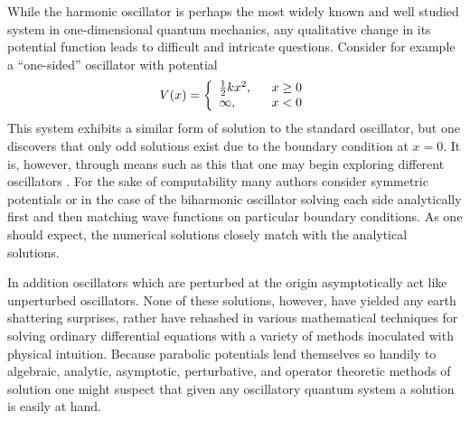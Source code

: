 \documentclass[12pt]{article}
\begin{document}
\par While the harmonic oscillator is perhaps the most widely known and well studied system in one-dimensional quantum mechanics, any qualitative change in its potential function leads to
difficult and intricate questions. Consider for example a ``one-sided'' oscillator with potential
\begin{equation}
V(x) = \left\{\begin{array}{ll}\frac{1}{2}kx^2, & \hspace{0.25cm} x\geq 0\\
\infty, & \hspace{0.25cm} x<0 \end{array}\right.
\end{equation}
This system exhibits a similar form of solution to the standard oscillator, but one discovers that only odd solutions exist due to the boundary condition at $x=0$. It is, however, through means such as this that one may begin exploring different oscillators \cite{Gettys-Graben,Janke-Cheng}. For the sake of computability many authors consider symmetric potentials or in the case of the biharmonic oscillator solving each side analytically first and then matching wave functions on particular boundary conditions. As one should expect, the numerical solutions closely match with the analytical solutions.
  
\par In addition oscillators which are perturbed at the origin asymptotically act like unperturbed oscillators. None of these solutions, however, have yielded any earth shattering surprises, rather have rehashed in various mathematical techniques for solving ordinary differential equations with a variety of methods inoculated with physical intuition. Because parabolic potentials lend themselves so handily to algebraic, analytic, asymptotic, perturbative, and operator theoretic methods of solution one might suspect 
that given any oscillatory quantum system a solution is easily at hand.
\end{document}
